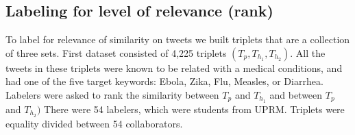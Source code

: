\documentclass[12pt]{report}
\begin{document}
\subsection{Labeling for level of relevance (rank)} \label{data_relevance_labeling}

To label for relevance of similarity on tweets we built triplets that are a collection of three sets. 
First  dataset consisted of  4,225 triplets $(T_p, T_{h_1}, T_{h_2})$. All the tweets in these triplets were known to 
be related with a medical conditions, and had one of the five target keywords: Ebola, Zika, Flu, Measles, or Diarrhea.
Labelers were asked to rank the similarity between $T_p$ and $T_{h_1}$ and between $T_p$ and $T_{h_2})$
There were 54 labelers, which were students from UPRM. Triplets were equality divided between 54 collaborators.  



\end{document}
